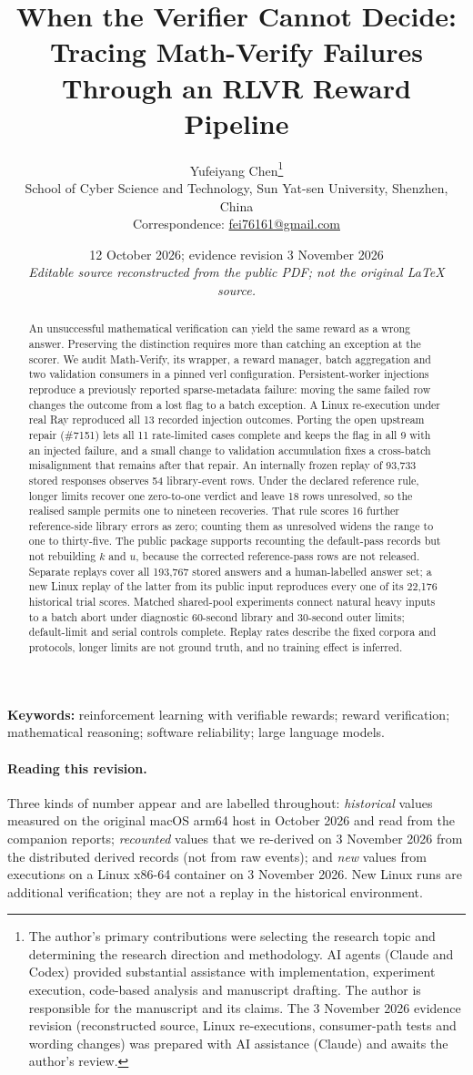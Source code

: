 \documentclass[11pt,a4paper]{article}
\title{When the Verifier Cannot Decide: Tracing Math-Verify Failures\\ Through an RLVR Reward Pipeline}
\author{Yufeiyang Chen\thanks{The author's primary contributions were selecting the research topic and determining the research direction and methodology. AI agents (Claude and Codex) provided substantial assistance with implementation, experiment execution, code-based analysis and manuscript drafting. The author is responsible for the manuscript and its claims. The 3 November 2026 evidence revision (reconstructed source, Linux re-executions, consumer-path tests and wording changes) was prepared with AI assistance (Claude) and awaits the author's review.}\\[2pt]
\small School of Cyber Science and Technology, Sun Yat-sen University, Shenzhen, China\\
\small Correspondence: \href{mailto:fei76161@gmail.com}{fei76161@gmail.com}}
\date{12 October 2026; evidence revision 3 November 2026\\[2pt]
\footnotesize\emph{Editable source reconstructed from the public PDF; not the original \LaTeX{} source.}}
\newcommand{\pr}[1]{\#{#1}}
\begin{document}
\maketitle

\begin{abstract}
\noindent An unsuccessful mathematical verification can yield the same reward as a wrong answer. Preserving the distinction requires more than catching an exception at the scorer. We audit Math-Verify, its wrapper, a reward manager, batch aggregation and two validation consumers in a pinned verl configuration. Persistent-worker injections reproduce a previously reported sparse-metadata failure: moving the same failed row changes the outcome from a lost flag to a batch exception. A Linux re-execution under real Ray reproduced all 13 recorded injection outcomes. Porting the open upstream repair (\pr{7151}) lets all 11 rate-limited cases complete and keeps the flag in all 9 with an injected failure, and a small change to validation accumulation fixes a cross-batch misalignment that remains after that repair. An internally frozen replay of 93,733 stored responses observes 54 library-event rows. Under the declared reference rule, longer limits recover one zero-to-one verdict and leave 18 rows unresolved, so the realised sample permits one to nineteen recoveries. That rule scores 16 further reference-side library errors as zero; counting them as unresolved widens the range to one to thirty-five. The public package supports recounting the default-pass records but not rebuilding $k$ and $u$, because the corrected reference-pass rows are not released. Separate replays cover all 193,767 stored answers and a human-labelled answer set; a new Linux replay of the latter from its public input reproduces every one of its 22,176 historical trial scores. Matched shared-pool experiments connect natural heavy inputs to a batch abort under diagnostic 60-second library and 30-second outer limits; default-limit and serial controls complete. Replay rates describe the fixed corpora and protocols, longer limits are not ground truth, and no training effect is inferred.
\end{abstract}

\noindent\textbf{Keywords:} reinforcement learning with verifiable rewards; reward verification; mathematical reasoning; software reliability; large language models.

\paragraph{Reading this revision.} Three kinds of number appear and are labelled throughout: \emph{historical} values measured on the original macOS arm64 host in October 2026 and read from the companion reports; \emph{recounted} values that we re-derived on 3 November 2026 from the distributed derived records (not from raw events); and \emph{new} values from executions on a Linux x86-64 container on 3 November 2026. New Linux runs are additional verification; they are not a replay in the historical environment.
\end{document}
